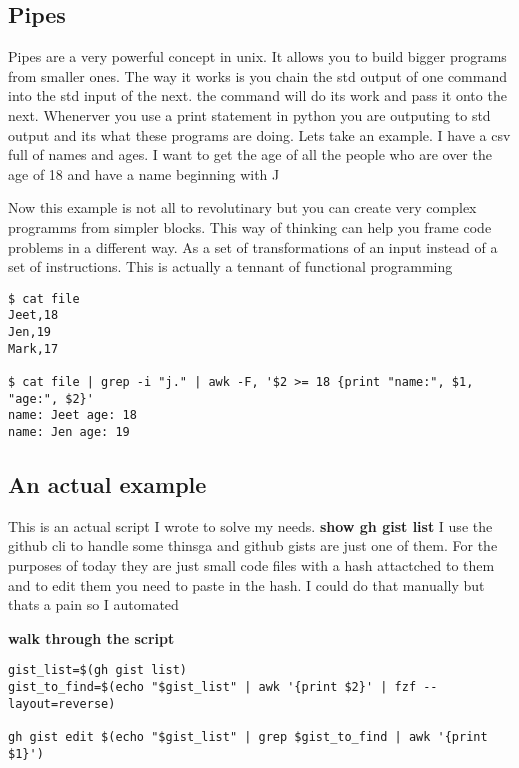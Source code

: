 \documentclass[a4paper]{article}
\begin{document}
\subsection*{Pipes}
\label{sec:orgbe6df64}
\begin{notes}
	Pipes are a very powerful concept in unix. It allows you to build bigger
	programs from smaller ones. The way it works is you chain the std output of one
	command into the std input of the next. the command will do its work and pass it
	onto the next. Whenerver you use a print statement in python you are outputing
	to std output and its what these programs are doing. Lets take an example. I
	have a csv full of names and ages. I want to get the age of all the people who
	are over the age of 18 and have a name beginning with J

	Now this example is not all to revolutinary but you can create very complex
	programms from simpler blocks. This way of thinking can help you frame code
	problems in a different way. As a set of transformations of an input instead of
	a set of instructions. This is actually a tennant of functional programming
\end{notes}

\begin{verbatim}
$ cat file
Jeet,18
Jen,19
Mark,17

$ cat file | grep -i "j." | awk -F, '$2 >= 18 {print "name:", $1, "age:", $2}'
name: Jeet age: 18
name: Jen age: 19
\end{verbatim}

\subsection*{An actual example}
\label{sec:orgfe2c9e5}
\begin{notes}
	This is an actual script I wrote to solve my needs. \textbf{show gh gist list}
	I use the github cli to handle some thinsga and github gists are just one of
	them. For the purposes of today they are just small code files with a hash
	attactched to them and to edit them you need to paste in the hash. I could do
	that manually but thats a pain so I automated

	\textbf{walk through the script}
\end{notes}

\begin{verbatim}
gist_list=$(gh gist list)
gist_to_find=$(echo "$gist_list" | awk '{print $2}' | fzf --layout=reverse)

gh gist edit $(echo "$gist_list" | grep $gist_to_find | awk '{print $1}')

\end{verbatim}
\end{document}
